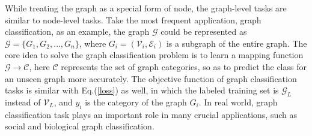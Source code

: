While treating the graph as a special form of node, the graph-level tasks are similar to node-level tasks. Take the most frequent application, graph classification, as an example, the graph $\mathcal{G}$ could be represented as $\mathcal{G}=\{ G_1, G_2,\dots, G_n \}$, where $G_i=(\mathcal{V}_i,\mathcal{E}_i)$ is a subgraph of the entire graph. The core idea to solve the graph classification problem is to learn a mapping function $\mathcal{G} \rightarrow \mathcal{C}$, here $\mathcal{C}$ represents the set of graph categories, so as to predict the class for an unseen graph more accurately. The objective function of graph classification tasks is similar with Eq.(\ref{loss}) as well, in which the labeled training set is $\mathcal{G}_L$ instead of $\mathcal{V}_L$, and $y_i$ is the category of the graph $G_i$. In real world, graph classification task plays an important role in many crucial applications, such as social and biological graph classification.